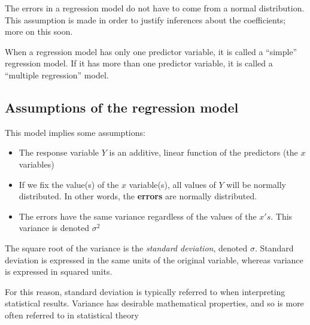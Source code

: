 \documentclass[
  letterpaper,
  DIV=11,
  numbers=noendperiod]{scrreprt}
\begin{document}
\begin{tcolorbox}[enhanced jigsaw, left=2mm, opacitybacktitle=0.6, coltitle=black, colframe=quarto-callout-note-color-frame, colback=white, bottomtitle=1mm, leftrule=.75mm, breakable, titlerule=0mm, title=\textcolor{quarto-callout-note-color}{\faInfo}\hspace{0.5em}{Note}, toptitle=1mm, colbacktitle=quarto-callout-note-color!10!white, arc=.35mm, bottomrule=.15mm, rightrule=.15mm, toprule=.15mm, opacityback=0]

The errors in a regression model do not have to come from a normal
distribution. This assumption is made in order to justify inferences
about the coefficients; more on this soon.

\end{tcolorbox}

When a regression model has only one predictor variable, it is called a
``simple'' regression model. If it has more than one predictor variable,
it is called a ``multiple regression'' model.

\hypertarget{assumptions-of-the-regression-model}{%
\subsection{Assumptions of the regression
model}\label{assumptions-of-the-regression-model}}

This model implies some assumptions:

\begin{itemize}
\item
  The response variable \(Y\) is an additive, linear function of the
  predictors (the \(x\) variables)
\item
  If we fix the value(s) of the \(x\) variable(s), all values of \(Y\)
  will be normally distributed. In other words, the \textbf{errors} are
  normally distributed.
\item
  The errors have the same variance regardless of the values of the
  \(x's\). This variance is denoted \(\sigma^2\)
\end{itemize}

\begin{tcolorbox}[enhanced jigsaw, left=2mm, opacitybacktitle=0.6, coltitle=black, colframe=quarto-callout-note-color-frame, colback=white, bottomtitle=1mm, leftrule=.75mm, breakable, titlerule=0mm, title=\textcolor{quarto-callout-note-color}{\faInfo}\hspace{0.5em}{Note}, toptitle=1mm, colbacktitle=quarto-callout-note-color!10!white, arc=.35mm, bottomrule=.15mm, rightrule=.15mm, toprule=.15mm, opacityback=0]

The square root of the variance is the \emph{standard deviation},
denoted \(\sigma\). Standard deviation is expressed in the same units of
the original variable, whereas variance is expressed in squared units.

For this reason, standard deviation is typically referred to when
interpreting statistical results. Variance has desirable mathematical
properties, and so is more often referred to in statistical theory

\end{tcolorbox}
\end{document}

